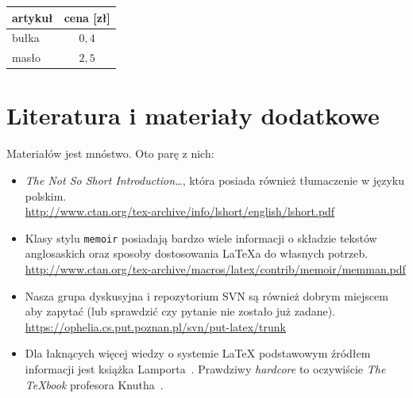 \begin{table}[h]
\label{tab:tabela2}
\centering\footnotesize%
\begin{tabular}{l c}
\toprule
artykuł & cena [zł] \\
\midrule
bułka   & $0,4$ \\
masło   & $2,5$ \\
\bottomrule
\end{tabular}
\end{table}


\section{Literatura i materiały dodatkowe}

Materiałów jest mnóstwo. Oto parę z nich:
\begin{itemize}
    \item \emph{The Not So Short Introduction\ldots}, która posiada również tłumaczenie 
    w języku polskim.\\
    \url{http://www.ctan.org/tex-archive/info/lshort/english/lshort.pdf}

    \item Klasy stylu \texttt{memoir} posiadają bardzo wiele informacji o składzie tekstów
    anglosaskich oraz sposoby dostosowania \LaTeX{}a do własnych potrzeb.\\
    \url{http://www.ctan.org/tex-archive/macros/latex/contrib/memoir/memman.pdf}
    
    \item Nasza grupa dyskusyjna i repozytorium SVN są również dobrym miejscem aby zapytać
    (lub sprawdzić czy pytanie nie zostało już zadane).\\
    \url{https://ophelia.cs.put.poznan.pl/svn/put-latex/trunk}

    \item Dla łaknących więcej wiedzy o systemie \LaTeX{} podstawowym źródłem informacji
    jest książka Lamporta~\cite{Lamport:LDP85}. Prawdziwy \emph{hardcore} to oczywiście
    \emph{The \TeX{}book} profesora Knutha~\cite{Knuth:ct-a}.
\end{itemize}

